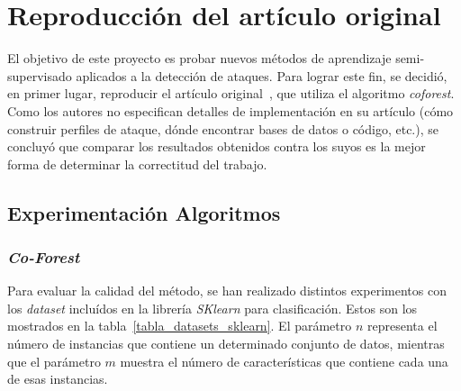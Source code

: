 


\section{Reproducción del artículo original}

El objetivo de este proyecto es probar nuevos métodos de aprendizaje semi-supervisado aplicados a la detección de ataques. Para lograr este fin, se decidió, en primer lugar, reproducir el artículo original~\cite{zhou2021SemisupervisedRecommendationAttack}, que utiliza el algoritmo \textit{coforest}. Como los autores no especifican detalles de implementación en su artículo (cómo construir perfiles de ataque, dónde encontrar bases de datos o código, etc.), se concluyó que comparar los resultados obtenidos contra los suyos es la mejor forma de determinar la correctitud del trabajo.

\subsection{Experimentación Algoritmos}

\subsubsection{\textit{Co-Forest}}
Para evaluar la calidad del método, se han realizado distintos experimentos con los \textit{dataset} incluídos en la librería \textit{SKlearn} para clasificación. Estos son los mostrados en la tabla~\ref{tabla_datasets_sklearn}. El parámetro $n$ representa el número de instancias que contiene un determinado conjunto de datos, mientras que el parámetro $m$ muestra el número de características que contiene cada una de esas instancias.

